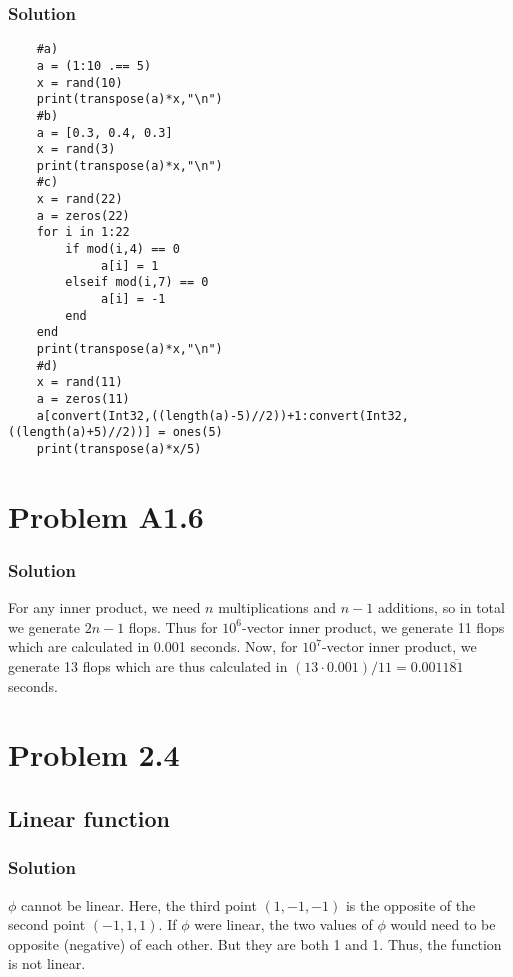 \documentclass{article}
\begin{document}
\subsubsection*{Solution}
\begin{enumerate}[label=(\alph*)]

  \begin{verbatim}
    #a)
    a = (1:10 .== 5)
    x = rand(10)
    print(transpose(a)*x,"\n")
    #b)
    a = [0.3, 0.4, 0.3]
    x = rand(3)
    print(transpose(a)*x,"\n")
    #c)
    x = rand(22)
    a = zeros(22)
    for i in 1:22
        if mod(i,4) == 0
             a[i] = 1
        elseif mod(i,7) == 0
             a[i] = -1
        end
    end
    print(transpose(a)*x,"\n")
    #d)
    x = rand(11)
    a = zeros(11)
    a[convert(Int32,((length(a)-5)//2))+1:convert(Int32,((length(a)+5)//2))] = ones(5)
    print(transpose(a)*x/5)
\end{verbatim}
\end{enumerate}

\section*{Problem A1.6}
\subsubsection*{Solution}
For any inner product, we need $n$ multiplications and $n-1$ additions, so in total we generate $2n-1$ flops. Thus for $10^6$-vector inner product, we generate 11 flops which are calculated in 0.001 seconds. Now, for $10^7$-vector inner product, we generate 13 flops which are thus calculated in $(13\cdot0.001)/11 = 0.0011\overline{81}$ seconds.

\section*{Problem 2.4}
\subsection*{Linear function}
\subsubsection*{Solution}
$\phi$ cannot be linear. Here, the third
point $(1, -1, -1)$ is the opposite of the second point $(-1, 1, 1)$. If $\phi$ were linear, the two values of $\phi$ would need to be opposite (negative) of each other. But they are both 1 and 1. Thus, the function is not linear.
\end{document}
